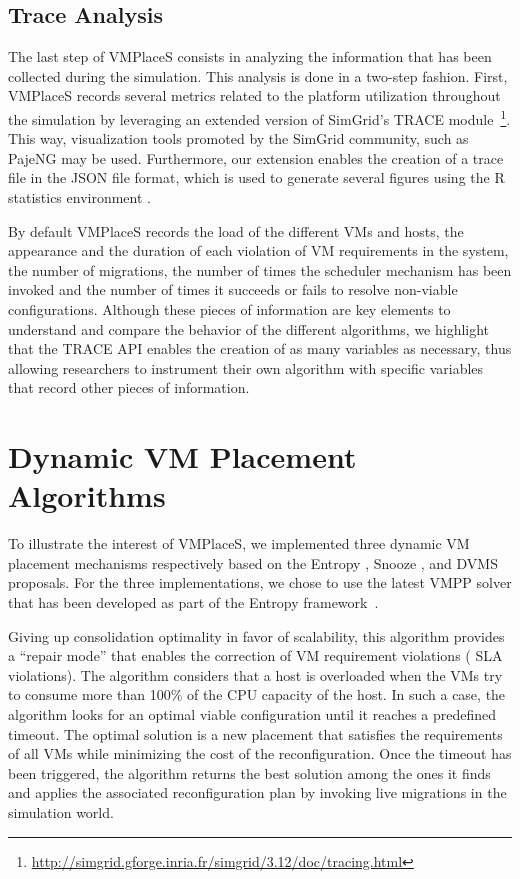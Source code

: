 \documentclass[conference]{IEEEtran}
\newcommand{\sg}{SimGrid\xspace}
\newcommand{\vmps}{VMPlaceS\xspace}
\begin{document}
\subsection{Trace Analysis}
\label{subsec:traces-analysis}

The last step of \vmps consists in analyzing the information that has
been collected during the simulation.
This analysis is done in a two-step fashion. First, \vmps records
several metrics related to the platform utilization throughout the
simulation by leveraging an extended version of \sg's TRACE
module~\footnote{\url{http://simgrid.gforge.inria.fr/simgrid/3.12/doc/tracing.html}}.
This way, visualization tools promoted by the \sg community, such as
PajeNG \cite{pageng:www} may be used. Furthermore, our extension
enables the creation of a trace file in the JSON file format, which is
used to generate several figures using the R statistics environment
\cite{R:Bloomfield:2014}.

By default \vmps records the load of the different VMs and hosts, the
appearance and the duration of each violation of VM requirements in
the system, the number of migrations, the number of times the
scheduler mechanism has been invoked and the number of times it
succeeds or fails to resolve non-viable configurations.
%
Although these pieces of information are key elements to understand
and compare the behavior of the different algorithms, we highlight
that the TRACE API enables the creation of as many variables as
necessary, thus allowing researchers to instrument their own algorithm
with specific variables that record other pieces of information.

\section{Dynamic VM Placement Algorithms}
\label{sec:vm-schedulers}
To illustrate the interest of \vmps, we implemented three dynamic VM
placement mechanisms respectively based on the Entropy
\cite{Hermenier:2009:ECM:1508293.1508300}, Snooze
\cite{feller:ccgrid12}, and DVMS \cite{quesnel:cpe2012} proposals. For the three
implementations, we chose to use the latest VMPP solver that has been
developed as part of the Entropy
framework~\cite{Hermenier:2009:ECM:1508293.1508300, hermenier:cp11}.

%
Giving up consolidation
optimality in favor of scalability, this algorithm provides a ``repair
mode'' that enables the correction of VM requirement violations (\aka
SLA violations). The algorithm considers that a host is
overloaded when the VMs try to consume more than 100\% of the CPU
capacity of the host. In such a case, the algorithm looks for
an optimal viable configuration until it reaches a predefined timeout.
The optimal solution is a new placement that satisfies
the requirements of all VMs while minimizing the cost of the
reconfiguration.
Once the timeout has been triggered, the algorithm returns
the best solution among the ones it finds and applies the associated
reconfiguration plan by invoking live migrations in the simulation
world.
\end{document}
